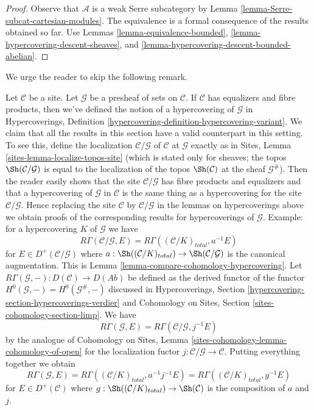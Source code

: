 \begin{proof}
Observe that $\mathcal{A}$ is a weak Serre subcategory by
Lemma \ref{lemma-Serre-subcat-cartesian-modules}.
The equivalence is a
formal consequence of the results obtained so far. Use
Lemmas \ref{lemma-equivalence-bounded},
\ref{lemma-hypercovering-descent-sheaves}, and
\ref{lemma-hypercovering-descent-bounded-abelian}.
\end{proof}

\noindent
We urge the reader to skip the following remark.

\begin{remark}
\label{remark-compare-cohomology-hypercovering-presheaf}
Let $\mathcal{C}$ be a site. Let $\mathcal{G}$ be a presheaf of sets on
$\mathcal{C}$. If $\mathcal{C}$ has equalizers and fibre products, then
we've defined the notion of a hypercovering of $\mathcal{G}$ in
Hypercoverings, Definition \ref{hypercovering-definition-hypercovering-variant}.
We claim that all the results in this section have a
valid counterpart in this setting.
To see this,
define the localization $\mathcal{C}/\mathcal{G}$
of $\mathcal{C}$ at $\mathcal{G}$ exactly as in
Sites, Lemma \ref{sites-lemma-localize-topos-site}
(which is stated only for sheaves; the topos
$\Sh(\mathcal{C}/\mathcal{G})$ is equal to the localization
of the topos $\Sh(\mathcal{C})$ at the sheaf $\mathcal{G}^\#$).
Then the reader easily shows that the site
$\mathcal{C}/\mathcal{G}$ has fibre products and equalizers
and that a hypercovering of $\mathcal{G}$ in $\mathcal{C}$
is the same thing as a hypercovering for the site $\mathcal{C}/\mathcal{G}$.
Hence replacing the site $\mathcal{C}$ by $\mathcal{C}/\mathcal{G}$
in the lemmas on hypercoverings above we obtain proofs of the
corresponding results for hypercoverings of $\mathcal{G}$.
Example: for a hypercovering $K$ of $\mathcal{G}$ we have
$$
R\Gamma(\mathcal{C}/\mathcal{G}, E) =
R\Gamma((\mathcal{C}/K)_{total}, a^{-1}E)
$$
for $E \in D^+(\mathcal{C}/\mathcal{G})$ where
$a : \Sh((\mathcal{C}/K)_{total}) \to \Sh(\mathcal{C}/\mathcal{G})$
is the canonical augmentation. This is
Lemma \ref{lemma-compare-cohomology-hypercovering}.
Let $R\Gamma(\mathcal{G}, -) : D(\mathcal{C}) \to D(\textit{Ab})$
be defined as the derived functor of the functor
$H^0(\mathcal{G}, -) = H^0(\mathcal{G}^\#, -)$
discussed in Hypercoverings, Section
\ref{hypercovering-section-hypercoverings-verdier} and
Cohomology on Sites, Section \ref{sites-cohomology-section-limp}.
We have
$$
R\Gamma(\mathcal{G}, E) = R\Gamma(\mathcal{C}/\mathcal{G}, j^{-1}E)
$$
by the analogue of Cohomology on Sites, Lemma
\ref{sites-cohomology-lemma-cohomology-of-open}
for the localization fuctor $j : \mathcal{C}/\mathcal{G} \to \mathcal{C}$.
Putting everything together we obtain
$$
R\Gamma(\mathcal{G}, E) =
R\Gamma((\mathcal{C}/K)_{total}, a^{-1}j^{-1}E) =
R\Gamma((\mathcal{C}/K)_{total}, g^{-1}E)
$$
for $E \in D^+(\mathcal{C})$ where
$g : \Sh((\mathcal{C}/K)_{total}) \to \Sh(\mathcal{C})$
is the composition of $a$ and $j$.
\end{remark}





